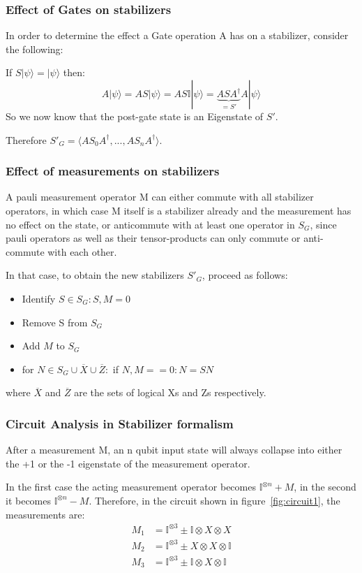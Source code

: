 \subsubsection{Effect of Gates on stabilizers}
In order to determine the effect a Gate operation A has on a
stabilizer, consider the following:

If $S|\psi\rangle = |\psi\rangle$ then:
\begin{equation}
A|\psi\rangle = AS|\psi\rangle = AS\mathbb{I}|\psi\rangle
	= \underbrace{ASA^{\dagger}}_{=S'}A|\psi\rangle
\end{equation}
So we now know that the post-gate state is an Eigenstate of $S'$.

Therefore $S'_{G} = \langle AS_{0}A^{\dagger},...,AS_{n}A^{\dagger}\rangle$.

\subsubsection{Effect of measurements on stabilizers}
A pauli measurement operator M can either commute with all stabilizer
operators, in which case M itself is a stabilizer already and the
measurement has no effect on the state, or anticommute with at
least one operator in $S_{G}$, since pauli operators as well as
their tensor-products can only commute or anti-commute with each
other.

In that case, to obtain the new stabilizers  $S'_{G}$, proceed
as follows:
\begin{itemize}
	\item Identify $S\in S_{G}: {S,M}=0$
	\item Remove S from $S_G$
	\item Add $M$ to $S_G$ 
	\item for $N \in S_G \cup\overline{X}\cup\overline{Z}:$
		if ${N,M}==0: N=SN$ 
\end{itemize}
where $\overline{X}$ and $\overline{Z}$ are the sets of 
logical Xs and Zs respectively.

\subsubsection{Circuit Analysis in Stabilizer formalism}
After a measurement M, an n qubit input state will always 
collapse into either the +1 or the -1 eigenstate of the 
measurement operator.

In the first case the acting measurement operator becomes 
$\mathbb{I}^{\otimes n}+M$, in the second it becomes
$\mathbb{I}^{\otimes n}-M$. Therefore, in the circuit shown in 
figure~\ref{fig:circuit1}, the measurements are:
\begin{align}
	M_{1} &= \mathbb{I}^{\otimes 3} \pm \mathbb{I}\otimes X
	\otimes X \\
	M_{2} & = \mathbb{I}^{\otimes 3} \pm X \otimes X \otimes
	\mathbb{I} \\
	M_{3} &= \mathbb{I}^{\otimes 3} \pm \mathbb{I} \otimes X
	\otimes \mathbb{I}
\end{align}

